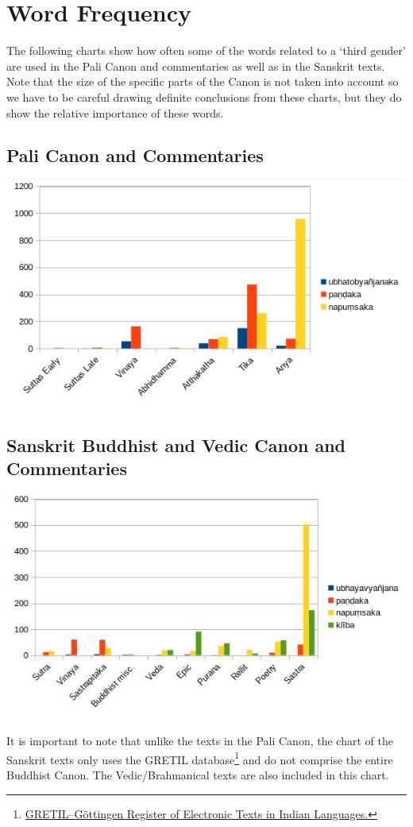 \section{Word Frequency}
\label{appendix2}

The following charts show how often some of the words related to a `third gender' are used in the Pali Canon and commentaries as well as in the Sanskrit texts. Note that the size of the specific parts of the Canon is not taken into account so we have to be careful drawing definite conclusions from these charts, but they do show the relative importance of these words. 

\subsection{Pali Canon and Commentaries}

\includegraphics[width=0.7\linewidth]{pali.jpg}

\begin{minipage}{0.8\linewidth}
\end{minipage}
\label{pali1}

\subsection{Sanskrit Buddhist and Vedic Canon and Commentaries}

\includegraphics[width=0.7\linewidth]{sanskrit.jpg}

\begin{minipage}{0.7\linewidth}
\end{minipage}
\label{sanskrit1}

\medskip
It is important to note that unlike the texts in the Pali Canon, the chart of the Sanskrit texts only uses the GRETIL database\footnote{\href{http://gretil.sub.uni-goettingen.de/gretil.html}{GRETIL--Göttingen Register of Electronic Texts in Indian Languages.}} and do not comprise the entire Buddhist Canon. The Vedic/Brahmanical texts are also included in this chart.

